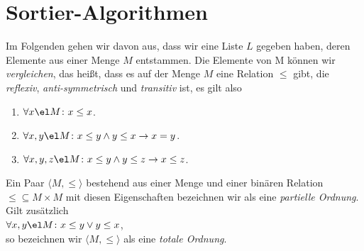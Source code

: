 \chapter{Sortier-Algorithmen}
Im Folgenden gehen wir davon aus, dass wir eine Liste $L$ gegeben haben, deren Elemente
aus einer Menge $M$ entstammen.  
Die Elemente von M k\"onnen wir \emph{vergleichen}, das
hei{\ss}t, dass es auf der Menge $M$  eine Relation
$\leq$ gibt, die \emph{reflexiv}, \emph{anti-symmetrisch} und \emph{transitiv} ist, es gilt also  
\begin{enumerate}
\item $\forall x \el M \colon x \leq x$.
\item $\forall x, y \el M \colon x \leq y \wedge y \leq x \rightarrow x = y$.
\item $\forall x, y, z \el M \colon x \leq y \wedge y \leq z \rightarrow x \leq z$. 
\end{enumerate}
Ein Paar $\langle M, \leq \rangle$ bestehend aus einer Menge und einer bin\"aren Relation
$\leq \subseteq M \times M$ mit diesen Eigenschaften bezeichnen wir als eine
\emph{partielle Ordnung}.  Gilt zus\"atzlich \\[0.1cm]
\hspace*{1.3cm} $\forall x, y \el M \colon x \leq y \vee y \leq x$, \\[0.1cm]
so bezeichnen wir $\langle M, \leq \rangle$ als eine \emph{totale Ordnung}.
\vspace*{0.3cm}

